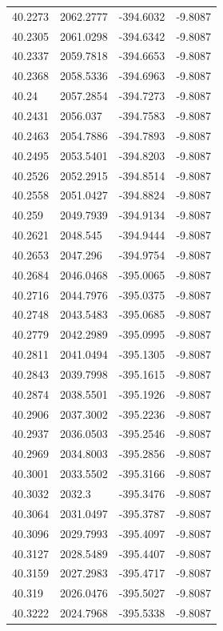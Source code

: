 \begin{table}[H]
\begin{tabular}{llll}
40.2273 & 2062.2777 & -394.6032 & -9.8087 \\
40.2305 & 2061.0298 & -394.6342 & -9.8087 \\
40.2337 & 2059.7818 & -394.6653 & -9.8087 \\
40.2368 & 2058.5336 & -394.6963 & -9.8087 \\
40.24 & 2057.2854 & -394.7273 & -9.8087 \\
40.2431 & 2056.037 & -394.7583 & -9.8087 \\
40.2463 & 2054.7886 & -394.7893 & -9.8087 \\
40.2495 & 2053.5401 & -394.8203 & -9.8087 \\
40.2526 & 2052.2915 & -394.8514 & -9.8087 \\
40.2558 & 2051.0427 & -394.8824 & -9.8087 \\
40.259 & 2049.7939 & -394.9134 & -9.8087 \\
40.2621 & 2048.545 & -394.9444 & -9.8087 \\
40.2653 & 2047.296 & -394.9754 & -9.8087 \\
40.2684 & 2046.0468 & -395.0065 & -9.8087 \\
40.2716 & 2044.7976 & -395.0375 & -9.8087 \\
40.2748 & 2043.5483 & -395.0685 & -9.8087 \\
40.2779 & 2042.2989 & -395.0995 & -9.8087 \\
40.2811 & 2041.0494 & -395.1305 & -9.8087 \\
40.2843 & 2039.7998 & -395.1615 & -9.8087 \\
40.2874 & 2038.5501 & -395.1926 & -9.8087 \\
40.2906 & 2037.3002 & -395.2236 & -9.8087 \\
40.2937 & 2036.0503 & -395.2546 & -9.8087 \\
40.2969 & 2034.8003 & -395.2856 & -9.8087 \\
40.3001 & 2033.5502 & -395.3166 & -9.8087 \\
40.3032 & 2032.3 & -395.3476 & -9.8087 \\
40.3064 & 2031.0497 & -395.3787 & -9.8087 \\
40.3096 & 2029.7993 & -395.4097 & -9.8087 \\
40.3127 & 2028.5489 & -395.4407 & -9.8087 \\
40.3159 & 2027.2983 & -395.4717 & -9.8087 \\
40.319 & 2026.0476 & -395.5027 & -9.8087 \\
40.3222 & 2024.7968 & -395.5338 & -9.8087 \\

\end{tabular}
\end{table}
